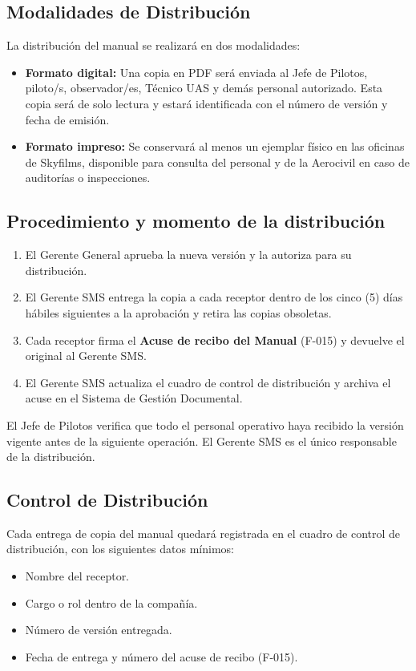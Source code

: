 \subsection*{Modalidades de Distribución}
La distribución del manual se realizará en dos modalidades:
\begin{itemize}
    \item \textbf{Formato digital:} Una copia en PDF será enviada al Jefe de Pilotos, piloto/s, observador/es, Técnico UAS y demás personal autorizado. Esta copia será de solo lectura y estará identificada con el número de versión y fecha de emisión.
    \item \textbf{Formato impreso:} Se conservará al menos un ejemplar físico en las oficinas de Skyfilms, disponible para consulta del personal y de la Aerocivil en caso de auditorías o inspecciones.
\end{itemize}

\subsection*{Procedimiento y momento de la distribución}
\begin{enumerate}
    \item El Gerente General aprueba la nueva versión y la autoriza para su distribución.
    \item El Gerente SMS entrega la copia a cada receptor dentro de los cinco (5) días hábiles siguientes a la aprobación y retira las copias obsoletas.
    \item Cada receptor firma el \textbf{Acuse de recibo del Manual} (F-015) y devuelve el original al Gerente SMS.
    \item El Gerente SMS actualiza el cuadro de control de distribución y archiva el acuse en el Sistema de Gestión Documental.
\end{enumerate}
El Jefe de Pilotos verifica que todo el personal operativo haya recibido la versión vigente antes de la siguiente operación. El Gerente SMS es el único responsable de la distribución.

\subsection*{Control de Distribución}
Cada entrega de copia del manual quedará registrada en el cuadro de control de distribución, con los siguientes datos mínimos:
\begin{itemize}
    \item Nombre del receptor.  
    \item Cargo o rol dentro de la compañía.  
    \item Número de versión entregada.  
    \item Fecha de entrega y número del acuse de recibo (F-015).
\end{itemize}

